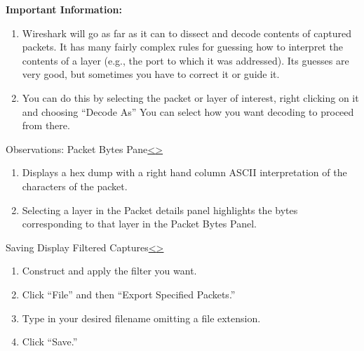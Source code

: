 \documentclass[12pt]{extarticle}
\newenvironment{instructionblock}{\Large\bgroup}{\egroup}
\newcommand{\ben}{\begin{enumerate}}
\newcommand{\een}{\end{enumerate}}
\begin{document}
\vspace{2mm}
\noindent
\textbf{Important Information:}

\ben

\item Wireshark will go as far as it can to dissect and decode contents of captured packets.  It has many fairly complex rules for guessing how to interpret the contents of a layer  (e.g., the port to which it was addressed).  Its guesses are very good, but sometimes you have to correct it or guide it.  

\item You can do this by selecting the packet or layer of interest, right clicking on it and choosing ``Decode As''  You can select how you want decoding to proceed from there.

\een



\pagebreak
\begin{slide}{Observations: Packet Bytes Pane}{\hyperref[slide 16]{\textless}\hyperref[slide 18]{\textgreater}}
\vskip 5pt
\begin{instructionblock}
\begin{enumerate}
\item Displays a hex dump with a right hand column ASCII interpretation of the characters of the packet.
\item Selecting a layer in the Packet details panel highlights the bytes corresponding to that layer in the Packet Bytes Panel.
\end{enumerate}
\end{instructionblock}
\end{slide}




\pagebreak
\begin{slide}{Saving Display Filtered Captures}{\hyperref[slide 17]{\textless}\hyperref[slide 19]{\textgreater}}
\vskip 5pt
\begin{instructionblock}
\begin{enumerate}
\item Construct and apply the filter you want. 
\item Click ``File'' and then ``Export Specified Packets.''
\item Type in your desired filename omitting a file extension.
\item Click ``Save.''
\end{enumerate}
\end{instructionblock}
\end{slide}
\end{document}
